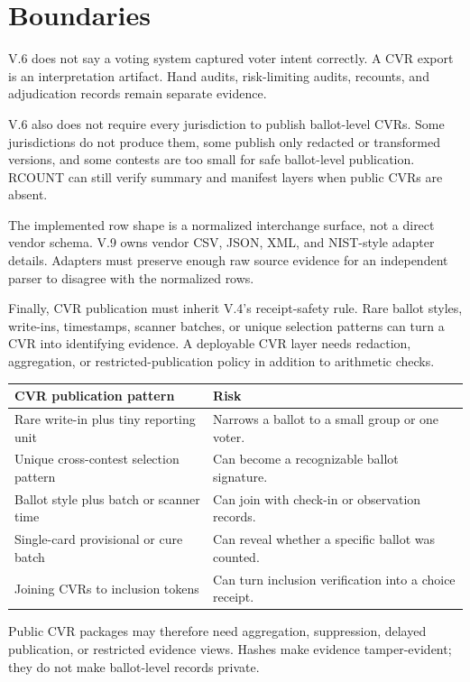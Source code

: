 \section{Boundaries}

V.6 does not say a voting system captured voter intent correctly. A CVR export
is an interpretation artifact. Hand audits, risk-limiting audits, recounts, and
adjudication records remain separate evidence.

V.6 also does not require every jurisdiction to publish ballot-level CVRs. Some
jurisdictions do not produce them, some publish only redacted or transformed
versions, and some contests are too small for safe ballot-level publication.
RCOUNT can still verify summary and manifest layers when public CVRs are absent.

The implemented row shape is a normalized interchange surface, not a direct
vendor schema. V.9 owns vendor CSV, JSON, XML, and NIST-style adapter details.
Adapters must preserve enough raw source evidence for an independent parser to
disagree with the normalized rows.

Finally, CVR publication must inherit V.4's receipt-safety rule. Rare ballot
styles, write-ins, timestamps, scanner batches, or unique selection patterns can
turn a CVR into identifying evidence. A deployable CVR layer needs redaction,
aggregation, or restricted-publication policy in addition to arithmetic checks.

\begin{center}
\small
\begin{tabularx}{\textwidth}{lX}
\toprule
CVR publication pattern & Risk \\
\midrule
Rare write-in plus tiny reporting unit & Narrows a ballot to a small group or one voter. \\
Unique cross-contest selection pattern & Can become a recognizable ballot signature. \\
Ballot style plus batch or scanner time & Can join with check-in or observation records. \\
Single-card provisional or cure batch & Can reveal whether a specific ballot was counted. \\
Joining CVRs to inclusion tokens & Can turn inclusion verification into a choice receipt. \\
\bottomrule
\end{tabularx}
\end{center}

Public CVR packages may therefore need aggregation, suppression, delayed
publication, or restricted evidence views. Hashes make evidence tamper-evident;
they do not make ballot-level records private.

